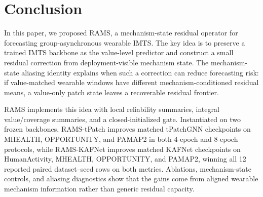 ﻿\documentclass[10pt,conference]{IEEEtran}
\newcommand{\method}{\textnormal{\mbox{RAMS}}}
\newcommand{\tpatchinst}{\textnormal{\mbox{RAMS-tPatch}}}
\newcommand{\kafinst}{\textnormal{\mbox{RAMS-KAFNet}}}
\newcommand{\baseT}{\textnormal{\mbox{tPatchGNN}}}
\newcommand{\baseK}{\textnormal{\mbox{KAFNet}}}
\begin{document}
\section{Conclusion}

In this paper, we proposed \method{}, a mechanism-state residual operator
for forecasting group-asynchronous wearable IMTS.  The key idea is to preserve
a trained IMTS backbone as the value-level predictor and construct a small
residual correction from deployment-visible mechanism state.  The
mechanism-state aliasing identity explains when such a correction can reduce
forecasting risk: if value-matched wearable windows have different
mechanism-conditioned residual means, a value-only patch state leaves a
recoverable residual frontier.

\method{} implements this idea with local reliability summaries, integral
value/coverage summaries, and a closed-initialized gate.  Instantiated on two
frozen backbones, \tpatchinst{} improves matched \baseT{} checkpoints on
MHEALTH, OPPORTUNITY, and PAMAP2 in both 4-epoch and 8-epoch protocols, while
\kafinst{} improves matched \baseK{} checkpoints on HumanActivity, MHEALTH,
OPPORTUNITY, and PAMAP2, winning all 12 reported paired dataset--seed rows on
both metrics.  Ablations, mechanism-state controls, and aliasing diagnostics
show that the gains come from aligned wearable mechanism information rather
than generic residual capacity.
\end{document}
